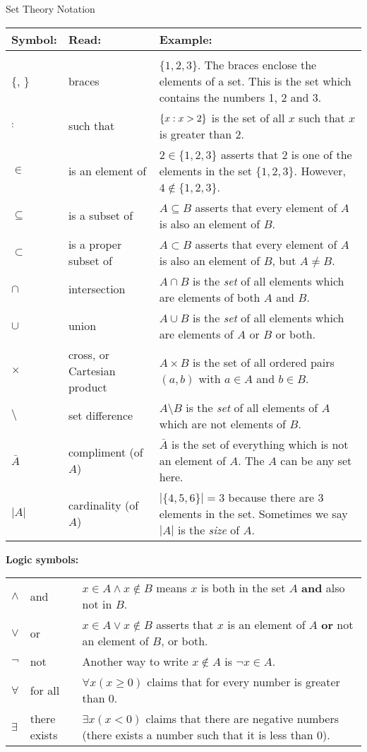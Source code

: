 \documentclass[12pt]{article}
\begin{document}
\begin{defbox}{Set Theory Notation}

\noindent  \begin{tabular}{p{.75in} p{1.5in} p{3.5in}}
    Symbol: & Read: & Example: \\ \hline \\[1ex]
    $\{$, $\}$ & braces & $\{1,2,3\}$.  The braces enclose the elements of a set.  This is the set which contains the numbers 1, 2 and 3.\\[1ex]
    $:$ & such that & $\{x : x > 2\}$ is the set of all $x$ such that $x$ is greater than 2.\\[1ex]
    $\in$ & is an element of & $2 \in \{1,2,3\}$ asserts that 2 is one of the elements in the set $\{1,2,3\}$.  However, $4 \notin\{1,2,3\}$.\\[1ex]
    $\subseteq$ & is a subset of & $A \subseteq B$ asserts that every element of $A$ is also an element of $B$.\\[1ex]
    $\subset$ & is a proper subset of & $A \subset B$ asserts that every element of $A$ is also an element of $B$, but $A \ne B$.\\[1ex]
    $\cap$ & intersection & $A \cap B$ is the \emph{set} of all elements which are elements of both $A$ and $B$.\\[1ex]
    $\cup$ & union & $A \cup B$ is the \emph{set} of all elements which are elements of $A$ or $B$ or both.\\[1ex]
    $\times$ & cross, or Cartesian product & $A \times B$ is the set of all ordered pairs $(a,b)$ with $a \in A$ and $b \in B$. \\[1ex]
    $\setminus$ & set difference & $A \setminus B$ is the \emph{set} of all elements of $A$ which are not elements of $B$.\\[1ex]
    $\bar A$ & compliment (of $A$) & $\bar A$ is the set of everything which is not an element of $A$.  The $A$ can be any set here.\\[1ex]
    $|A|$ & cardinality (of $A$)& $|\{4,5,6\}| = 3$ because there are 3 elements in the set.  Sometimes we say $|A|$ is the \emph{size} of $A$.\\[1ex]
\end{tabular}
\noindent\textbf{Logic symbols:}

\noindent  \begin{tabular}{p{.75in} p{1.5in} p{3.5in}}

    $\wedge$ & and & $x \in A \wedge x \notin B$ means $x$ is both in the set $A$ \textbf{and} also not in $B$. \\[1ex]
    $\vee$ & or & $x \in A \vee x \notin B$ asserts that $x$ is an element of $A$ \textbf{or} not an element of $B$, or both. \\[1ex]
    $\neg$ & not & Another way to write $x \notin A$ is $\neg x \in A$.\\[1ex]
    $\forall$ & for all & $\forall x (x \ge 0)$ claims that for every number is greater than 0. \\[1ex]
    $\exists$ & there exists & $\exists x (x < 0)$ claims that there are negative numbers (there exists a number such that it is less than 0). \\[1ex]
  \end{tabular}


\end{defbox}
\end{document}
